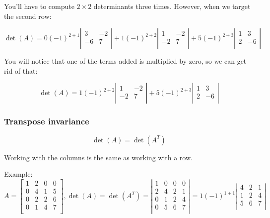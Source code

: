 \documentclass[12pt]{article}
\theoremstyle{plain}
\theoremstyle{remark}
\theoremstyle{definition}
\begin{document}
You'll have to compute \(2 \times 2\) determinants three times. However,
when we target the second row:

\[\det(A) = 0( - 1)^{2 + 1}\left| \begin{matrix}
3 & - 2 \\
 - 6 & 7 \\
\end{matrix} \right| + 1( - 1)^{2 + 2}\left| \begin{matrix}
1 & - 2 \\
 - 2 & 7 \\
\end{matrix} \right| + 5( - 1)^{2 + 3}\left| \begin{matrix}
1 & 3 \\
2 & - 6 \\
\end{matrix} \right|\]

You will notice that one of the terms added is multiplied by zero, so we
can get rid of that:

\[\det(A) = 1( - 1)^{2 + 2}\left| \begin{matrix}
1 & - 2 \\
 - 2 & 7 \\
\end{matrix} \right| + 5( - 1)^{2 + 3}\left| \begin{matrix}
1 & 3 \\
2 & - 6 \\
\end{matrix} \right|\]


\subsubsection{Transpose invariance}

\[\det(A) = \det\left( A^{T} \right)\]

Working with the columns is the same as working with a row.

Example: \(A = \begin{bmatrix}
1 & 2 & 0 & 0 \\
0 & 4 & 1 & 5 \\
0 & 2 & 2 & 6 \\
0 & 1 & 4 & 7 \\
\end{bmatrix},\det(A) = \det\left( A^{T} \right) = \left| \begin{matrix}
1 & 0 & 0 & 0 \\
2 & 4 & 2 & 1 \\
0 & 1 & 2 & 4 \\
0 & 5 & 6 & 7 \\
\end{matrix} \right| = 1( - 1)^{1 + 1}\left| \begin{matrix}
4 & 2 & 1 \\
1 & 2 & 4 \\
5 & 6 & 7 \\
\end{matrix} \right|\)
\end{document}

